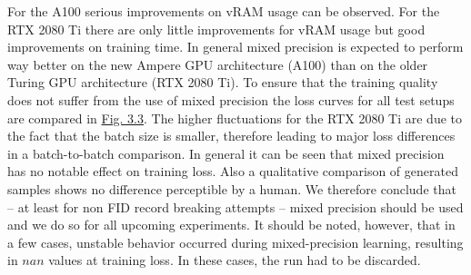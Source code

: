 For the A100 serious improvements on vRAM usage can be observed. For the RTX 2080 Ti there are only little improvements for vRAM usage but good improvements on training time. In general mixed precision is expected to perform way better on the new Ampere GPU
architecture (A100) than on the older Turing GPU architecture (RTX 2080 Ti). To ensure that the training quality does not suffer from the use of mixed precision the loss curves for all test setups are compared in \hyperref[fig:3.3]{Fig. 3.3}. The higher fluctuations for the RTX 2080 Ti are due to the fact that the batch size is smaller, therefore leading to major loss differences in a batch-to-batch comparison. In general it can be seen that mixed precision has no notable effect on training loss. Also a qualitative comparison of generated samples shows no difference perceptible by a human. We therefore conclude that – at least for non FID record breaking attempts – mixed precision should be used and we do so for all upcoming experiments. It should be noted, however, that in a few cases, unstable behavior occurred during mixed-precision learning, resulting in $nan$ values at training loss. In these cases, the run had to be discarded.
%
